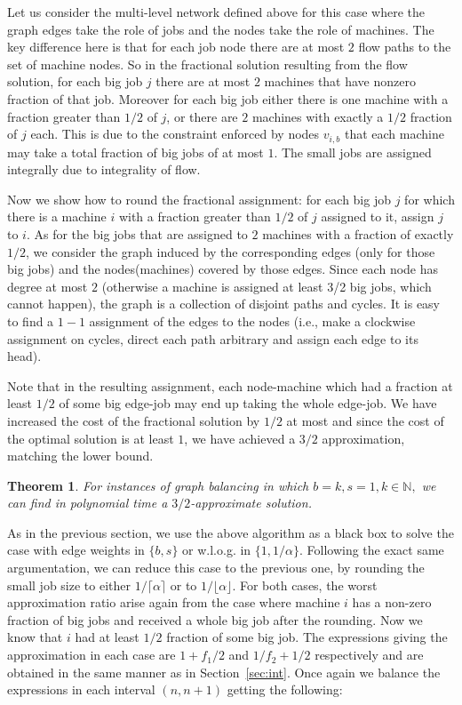 \documentclass[11pt]{article}\usepackage{amsmath}
\newtheorem{theorem}{Theorem}[section]
\begin{document}
Let us  consider the multi-level  network defined above for  this case
where the graph edges take  the role of jobs and the nodes  take the role of
machines. The key difference here is  that for each job node there are
at  most $2$  flow  paths  to the  set  of machine  nodes.  So in  the
fractional solution resulting from the flow solution, for each big job
$j$ there are at most $2$  machines that have nonzero fraction of that
job. Moreover  for each  big job  either there is  one machine  with a
fraction greater  than $1/2$  of $j$, or  there are $2$  machines with
exactly a $1/2$  fraction of $j$ each. This is  due to the constraint
enforced by nodes $v_{i,b}$ that each machine may take a total fraction of
big jobs of at most $1$. The small jobs are assigned integrally due to
integrality of flow.

Now we show  how to round the fractional assignment:  for each big job
$j$ for  which there  is a  machine $i$ with  a fraction  greater than
$1/2$ of $j$  assigned to it, assign  $j$ to $i$. As for  the big jobs
that are assigned to $2$ machines with a fraction of exactly $1/2$, we
consider the graph induced by the corresponding edges (only for those big jobs) and the nodes(machines) covered by those edges. Since
each  node has  degree  at most  $2$ (otherwise a machine is assigned at least 3/2 big jobs, which cannot happen),  the graph  is  a collection  of
disjoint paths  and cycles. It is  easy to find a  $1-1$ assignment of
the edges  to the  nodes (i.e., make  a clockwise assignment  on cycles,
direct each path arbitrary and assign each edge to its head).

Note that in the resulting assignment, each node-machine which had a fraction at least $1/2$ of some big edge-job may end up taking the whole edge-job. We have increased the cost of the fractional solution by $1/2$ at most and since the cost of the optimal solution is at least $1$, we have achieved a $3/2$ approximation, matching the lower bound.

\begin{theorem}
For instances of graph balancing in which $b=k, s=1, k \in \mathbb{N},$ we can  find in polynomial time a $3/2$-approximate solution.
\end{theorem}

As in the previous section, we  use the above algorithm as a black box
to solve the case with edge weights in $\{ b,s\}$ or w.l.o.g. in $\{ 1,1/\alpha \}.$
Following the exact same  argumentation, we can reduce this case
to the  previous one,  by rounding  the small job  size to  either $1/
\lceil  \alpha  \rceil$  or   to  $1/  \lfloor  \alpha  \rfloor$. For both cases, the worst approximation ratio arise again from the case where machine $i$ has a non-zero fraction of big jobs and received a whole big job after the rounding. Now we know that $i$ had at least $1/2$ fraction of some big job. The
expressions  giving   the  approximation   in  each  case   are 
$1+f_1/2$  and $1/f_2+1/2$ respectively and are obtained in the same
manner as in Section~\ref{sec:int}. 
Once again we  balance the  expressions in  each
interval $(n,n+1)$ getting the following:
\end{document}
